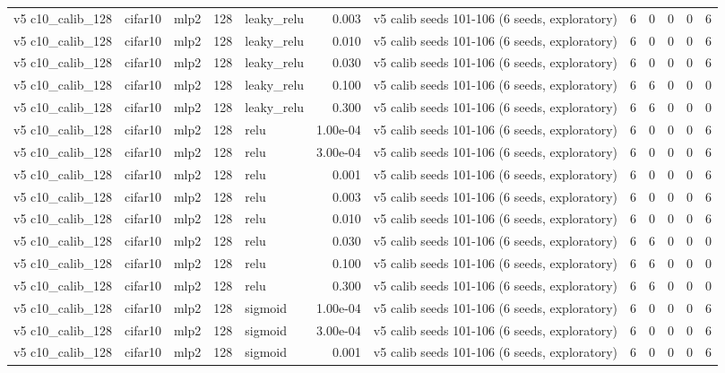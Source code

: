 \begin{table}[htbp]
{\begin{tabular}{@{}lllrlrlrrrrr@{}}
v5 c10\_calib\_128 & cifar10 & mlp2 & 128 & leaky\_relu & 0.003 & v5 calib seeds 101-106 (6 seeds, exploratory) & 6 & 0 & 0 & 0 & 6 \\
v5 c10\_calib\_128 & cifar10 & mlp2 & 128 & leaky\_relu & 0.010 & v5 calib seeds 101-106 (6 seeds, exploratory) & 6 & 0 & 0 & 0 & 6 \\
v5 c10\_calib\_128 & cifar10 & mlp2 & 128 & leaky\_relu & 0.030 & v5 calib seeds 101-106 (6 seeds, exploratory) & 6 & 0 & 0 & 0 & 6 \\
v5 c10\_calib\_128 & cifar10 & mlp2 & 128 & leaky\_relu & 0.100 & v5 calib seeds 101-106 (6 seeds, exploratory) & 6 & 6 & 0 & 0 & 0 \\
v5 c10\_calib\_128 & cifar10 & mlp2 & 128 & leaky\_relu & 0.300 & v5 calib seeds 101-106 (6 seeds, exploratory) & 6 & 6 & 0 & 0 & 0 \\
v5 c10\_calib\_128 & cifar10 & mlp2 & 128 & relu & 1.00e-04 & v5 calib seeds 101-106 (6 seeds, exploratory) & 6 & 0 & 0 & 0 & 6 \\
v5 c10\_calib\_128 & cifar10 & mlp2 & 128 & relu & 3.00e-04 & v5 calib seeds 101-106 (6 seeds, exploratory) & 6 & 0 & 0 & 0 & 6 \\
v5 c10\_calib\_128 & cifar10 & mlp2 & 128 & relu & 0.001 & v5 calib seeds 101-106 (6 seeds, exploratory) & 6 & 0 & 0 & 0 & 6 \\
v5 c10\_calib\_128 & cifar10 & mlp2 & 128 & relu & 0.003 & v5 calib seeds 101-106 (6 seeds, exploratory) & 6 & 0 & 0 & 0 & 6 \\
v5 c10\_calib\_128 & cifar10 & mlp2 & 128 & relu & 0.010 & v5 calib seeds 101-106 (6 seeds, exploratory) & 6 & 0 & 0 & 0 & 6 \\
v5 c10\_calib\_128 & cifar10 & mlp2 & 128 & relu & 0.030 & v5 calib seeds 101-106 (6 seeds, exploratory) & 6 & 6 & 0 & 0 & 0 \\
v5 c10\_calib\_128 & cifar10 & mlp2 & 128 & relu & 0.100 & v5 calib seeds 101-106 (6 seeds, exploratory) & 6 & 6 & 0 & 0 & 0 \\
v5 c10\_calib\_128 & cifar10 & mlp2 & 128 & relu & 0.300 & v5 calib seeds 101-106 (6 seeds, exploratory) & 6 & 6 & 0 & 0 & 0 \\
v5 c10\_calib\_128 & cifar10 & mlp2 & 128 & sigmoid & 1.00e-04 & v5 calib seeds 101-106 (6 seeds, exploratory) & 6 & 0 & 0 & 0 & 6 \\
v5 c10\_calib\_128 & cifar10 & mlp2 & 128 & sigmoid & 3.00e-04 & v5 calib seeds 101-106 (6 seeds, exploratory) & 6 & 0 & 0 & 0 & 6 \\
v5 c10\_calib\_128 & cifar10 & mlp2 & 128 & sigmoid & 0.001 & v5 calib seeds 101-106 (6 seeds, exploratory) & 6 & 0 & 0 & 0 & 6 \\

\end{tabular}}
\end{table}
